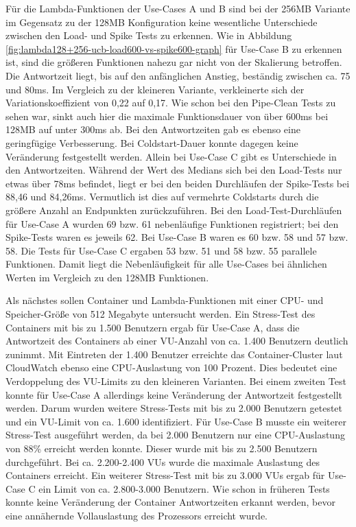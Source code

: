 Für die Lambda-Funktionen der Use-Cases A und B sind bei der 256MB Variante im Gegensatz zu der 128MB Konfiguration keine wesentliche Unterschiede zwischen den Load- und Spike Tests zu erkennen. Wie in Abbildung \ref{fig:lambda128+256-ucb-load600-vs-spike600-graph} für Use-Case B zu erkennen ist, sind die größeren Funktionen nahezu gar nicht von der Skalierung betroffen. Die Antwortzeit liegt, bis auf den anfänglichen Anstieg, beständig zwischen ca. 75 und 80ms. Im Vergleich zu der kleineren Variante, verkleinerte sich der Variationskoeffizient von 0,22 auf 0,17. Wie schon bei den Pipe-Clean Tests zu sehen war, sinkt auch hier die maximale Funktionsdauer von über 600ms bei 128MB auf unter 300ms ab. Bei den Antwortzeiten gab es ebenso eine geringfügige Verbesserung. Bei Coldstart-Dauer konnte dagegen keine Veränderung festgestellt werden.
Allein bei Use-Case C gibt es Unterschiede in den Antwortzeiten. Während der Wert des Medians sich bei den Load-Tests nur etwas über 78ms befindet, liegt er bei den beiden Durchläufen der Spike-Tests bei 88,46 und 84,26ms. Vermutlich ist dies auf vermehrte Coldstarts durch die größere Anzahl an Endpunkten zurückzuführen.
Bei den Load-Test-Durchläufen für Use-Case A wurden 69 bzw. 61 nebenläufige Funktionen registriert; bei den Spike-Tests waren es jeweils 62. Bei Use-Case B waren es 60 bzw. 58 und 57 bzw. 58. Die Tests für Use-Case C ergaben 53 bzw. 51 und 58 bzw. 55 parallele Funktionen. Damit liegt die Nebenläufigkeit für alle Use-Cases bei ähnlichen Werten im Vergleich zu den 128MB Funktionen.


Als nächstes sollen Container und Lambda-Funktionen mit einer CPU- und Speicher-Größe von 512 Megabyte untersucht werden. Ein Stress-Test des Containers mit bis zu 1.500 Benutzern ergab für Use-Case A, dass die Antwortzeit des Containers ab einer \ac{VU}-Anzahl von ca. 1.400 Benutzern deutlich zunimmt. Mit Eintreten der 1.400 Benutzer erreichte das Container-Cluster laut CloudWatch ebenso eine CPU-Auslastung von 100 Prozent. Dies bedeutet eine Verdoppelung des \ac{VU}-Limits zu den kleineren Varianten. Bei einem zweiten Test konnte für Use-Case A allerdings keine Veränderung der Antwortzeit festgestellt werden. Darum wurden weitere Stress-Tests mit bis zu 2.000 Benutzern getestet und ein \ac{VU}-Limit von ca. 1.600 identifiziert. Für Use-Case B musste ein weiterer Stress-Test ausgeführt werden, da bei 2.000 Benutzern nur eine CPU-Auslastung von 88\% erreicht werden konnte. Dieser wurde mit bis zu 2.500 Benutzern durchgeführt. Bei ca. 2.200-2.400 \acp{VU} wurde die maximale Auslastung des Containers erreicht. Ein weiterer Stress-Test mit bis zu 3.000 \acp{VU} ergab für Use-Case C ein Limit von ca. 2.800-3.000 Benutzern. Wie schon in früheren Tests konnte keine Veränderung der Container Antwortzeiten erkannt werden, bevor eine annähernde Vollauslastung des Prozessors erreicht wurde.

